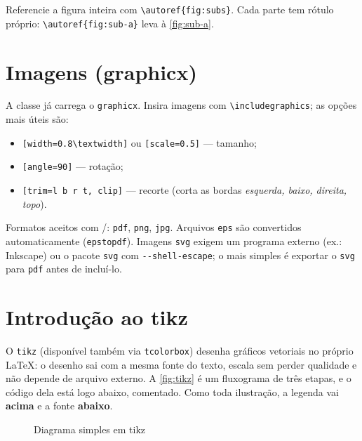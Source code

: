 \documentclass[dsc,pdfa]{coppe}
\begin{document}
Referencie a figura inteira com \verb|\autoref{fig:subs}|. Cada parte tem
rótulo próprio: \verb|\autoref{fig:sub-a}| leva à \autoref{fig:sub-a}.

\section{Imagens (graphicx)}

A classe já carrega o \verb|graphicx|. Insira imagens com \verb|\includegraphics|; as opções mais úteis são:
\begin{itemize}
  \item \verb|[width=0.8\textwidth]| ou \verb|[scale=0.5]| --- tamanho;
  \item \verb|[angle=90]| --- rotação;
  \item \verb|[trim=l b r t, clip]| --- recorte (corta as bordas \emph{esquerda, baixo, direita, topo}).
\end{itemize}
Formatos aceitos com /: \texttt{pdf}, \texttt{png}, \texttt{jpg}. Arquivos \texttt{eps} são convertidos automaticamente (\texttt{epstopdf}). Imagens \texttt{svg} exigem um programa externo (ex.: Inkscape) ou o pacote \verb|svg| com \verb|--shell-escape|; o mais simples é exportar o \texttt{svg} para \texttt{pdf} antes de incluí-lo.

\section{Introdução ao tikz}

O \verb|tikz| (disponível também via \verb|tcolorbox|) desenha gráficos vetoriais no próprio \LaTeX: o desenho sai com a mesma fonte do texto, escala sem perder qualidade e não depende de arquivo externo. A \autoref{fig:tikz} é um fluxograma de três etapas, e o código dela está logo abaixo, comentado. Como toda ilustração, a legenda vai \textbf{acima} e a fonte \textbf{abaixo}.

\begin{figure}[ht]
  \centering
  \caption{Diagrama simples em tikz}
  \label{fig:tikz}
\end{figure}
\end{document}

